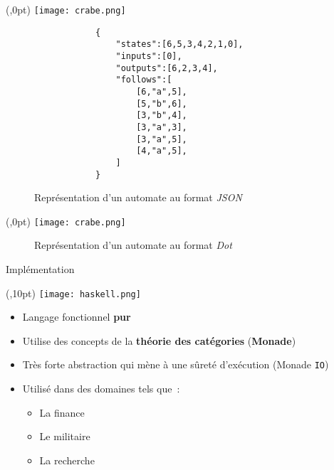 \documentclass[aspectratio=169,xcolor=dvipsnames]{beamer}
\begin{document}
\begin{frame}[fragile]
    \begin{textblock*}{20pt}(\textwidth-70pt,0pt)
        \texttt{[image: crabe.png]}
    \end{textblock*}
    \begin{figure}  
        \begin{verbatim}
            {
                "states":[6,5,3,4,2,1,0],
                "inputs":[0],
                "outputs":[6,2,3,4],
                "follows":[
                    [6,"a",5],
                    [5,"b",6],
                    [3,"b",4],
                    [3,"a",3],
                    [3,"a",5],
                    [4,"a",5],
                ]
            }
        \end{verbatim}
        \caption{
            Représentation d'un automate au format \textit{JSON} 
        }
    \end{figure}  
\end{frame}


\begin{frame}
    \begin{textblock*}{20pt}(\textwidth-70pt,0pt)
        \texttt{[image: crabe.png]}
    \end{textblock*}
    \begin{figure}
        
        \caption{
            Représentation d'un automate au format \textit{Dot} 
        }
    \end{figure}
\end{frame}



\begin{frame}{Implémentation}
    \begin{textblock*}{20pt}(\textwidth-50pt,10pt)
        \texttt{[image: haskell.png]}
    \end{textblock*}
    \begin{itemize}
        \item[\textbullet] Langage fonctionnel \textbf{pur}
        \item[\textbullet] Utilise des concepts de la 
        \textbf{théorie des catégories} (\textbf{Monade})
        \item[\textbullet] Très forte abstraction qui mène à une sûreté 
        d'exécution (Monade \texttt{IO})
        \item[\textbullet] Utilisé dans des domaines tels que~:
            \begin{itemize}
                \item[\textbullet] La finance
                \item[\textbullet] Le militaire
                \item[\textbullet] La recherche  
            \end{itemize} 
    \end{itemize}
\end{frame}
\end{document}

